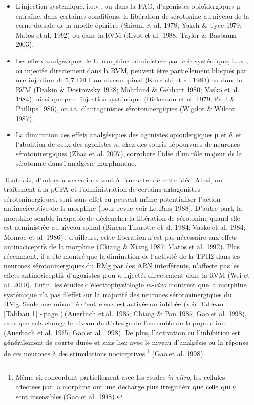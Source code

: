\documentclass[a4paper,12pt,twoside]{report}
\begin{document}
\begin{itemize}
\item L’injection systémique, i.c.v., ou dans la PAG, d’agonistes opioïdergiques µ entraîne, dans certaines conditions, la libération de sérotonine au niveau de la corne dorsale de la moelle épinière (Shiomi et al. 1978; Yaksh \& Tyce 1979; Matos et al. 1992) ou dans la RVM (Rivot et al. 1988; Taylor \& Basbaum 2003). 
\item Les effets analgésiques de la morphine administrée par voie systémique, i.c.v., ou injectée directement dans la RVM, peuvent être partiellement bloqués par une injection de 5,7-DHT au niveau spinal (Kuraishi et al. 1983) ou dans la RVM (Deakin \& Dostrovsky 1978; Mohrland \& Gebhart 1980; Vasko et al. 1984), ainsi que par l’injection systémique (Dickenson et al. 1979; Paul \& Phillips 1986), ou i.t. d’antagonistes sérotoninergiques (Wigdor \& Wilcox 1987).
\item La diminution des effets analgésiques des agonistes opioïdergiques µ et $\delta$, et l’abolition de ceux des agonistes $\kappa$, chez des souris dépourvues de neurones sérotoninergiques (Zhao et al. 2007), corrobore l’idée d’un rôle majeur de la sérotonine dans l’analgésie morphinique.
\end{itemize}

\bigskip 

Toutefois, d’autres observations vont à l’encontre de cette idée. Ainsi, un traitement à la pCPA et l’administration de certains antagonistes sérotoninergiques, sont sans effet ou peuvent même potentialiser l’action antinociceptive de la morphine (pour revue voir Le Bars 1988). D’autre part, la morphine semble incapable de déclencher la libération de sérotonine quand elle est administrée au niveau spinal (Bineau-Thurotte et al. 1984; Vasko et al. 1984; Monroe et al. 1986) ; d’ailleurs, cette libération n’est pas nécessaire aux effets antinociceptifs de la morphine (Chiang \& Xiang 1987; Matos et al. 1992). Plus récemment, il a été montré que la diminution de l’activité de la TPH2 dans les neurones sérotoninergiques du RMg par des ARN interférents, n’affecte pas les effets antinociceptifs d’agonistes µ ou $\kappa$ injectés directement dans la RVM (Wei et al. 2010). Enfin, les études d’électrophysiologie \textit{in-vivo} montrent que la morphine systémique n’a pas d’effet sur la majorité des neurones sérotoninergiques du RMg. Seule une minorité d’entre eux est activée ou inhibée (voir Tableau \ref{Tableau 1} - page \pageref{Tableau 1}) (Auerbach et al. 1985; Chiang \& Pan 1985; Gao et al. 1998), sans que cela change le niveau de décharge de l’ensemble de la population (Auerbach et al. 1985; Gao et al. 1998). De plus, l’activation ou l’inhibition est généralement de courte durée et sans lien avec le niveau d’analgésie ou la réponse de ces neurones à des stimulations nociceptives
\footnote{Même si, concordant partiellement avec les études \textit{in-vitro}, les cellules affectées par la morphine ont une décharge plus irrégulière que celle qui y sont insensibles (Gao et al. 1998).} 
(Gao et al. 1998).
\end{document}
